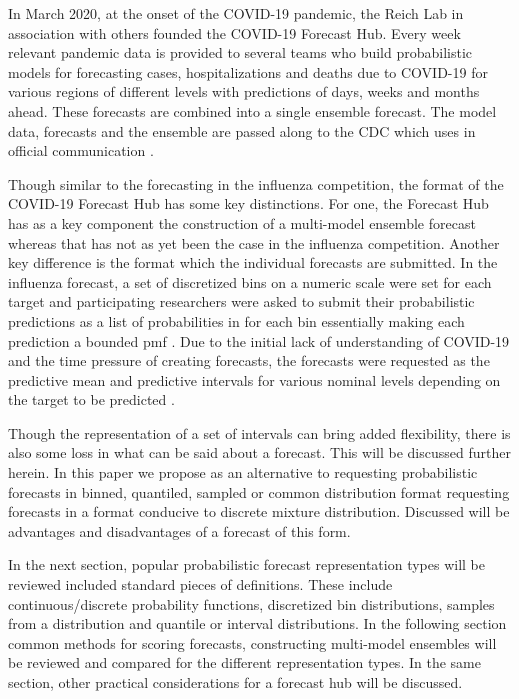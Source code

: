 \documentclass{article}\usepackage[]{graphicx}\usepackage[]{color}
\begin{document}
In March 2020, at the onset of the COVID-19 pandemic, the Reich Lab in
association with others founded the COVID-19 Forecast Hub. Every week relevant
pandemic data is provided to several teams who build probabilistic models for
forecasting cases, hospitalizations and deaths due to COVID-19 for various 
regions of different levels with predictions of days, weeks and months ahead.
These forecasts are combined into a single ensemble forecast. The model data,
forecasts and the ensemble are passed along to the CDC which uses in official
communication \cite{Cramer2021-hub-dataset}.

Though similar to the forecasting in the influenza competition, the format of 
the COVID-19 Forecast Hub has some key distinctions. For one, the Forecast Hub
has as a key component the construction of a multi-model ensemble forecast 
whereas that has not as yet been the case in the influenza competition. Another 
key difference is the format which the individual forecasts are submitted. In 
the influenza forecast, a set of discretized bins on a numeric scale were set
for each target and participating researchers were asked to submit their 
probabilistic predictions as a list of probabilities in for each bin essentially
making each prediction a bounded pmf \cite{mcgowan2019collaborative}.
Due to the initial lack of understanding of COVID-19 and the time pressure of
creating forecasts, the forecasts were requested as the predictive mean and 
predictive intervals for various nominal levels depending on the target to be
predicted \cite{bracher2021evaluating}. 

Though the representation of a set of intervals can bring added flexibility, 
there is also some loss in what can be said about a forecast. This will be 
discussed further herein. In this paper we propose as an alternative to 
requesting probabilistic forecasts in binned, quantiled, sampled or common 
distribution format requesting forecasts in a format conducive to discrete 
mixture distribution. Discussed will be advantages and disadvantages of
a forecast of this form.

In the next section, popular probabilistic forecast representation types
will be reviewed included standard pieces of definitions. These include 
continuous/discrete probability functions, discretized bin distributions,
samples from a distribution and quantile or interval distributions. In the 
following section common methods for scoring forecasts, constructing multi-model
ensembles will be reviewed and compared for the different representation types. 
In the same section, other practical considerations for a forecast hub will be
discussed.
\end{document}

